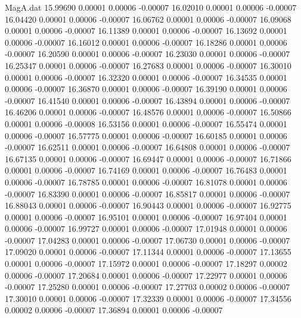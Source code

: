\begin{filecontents}{MagA.dat}
  15.99690    0.00001    0.00006   -0.00007
  16.02010    0.00001    0.00006   -0.00007
  16.04420    0.00001    0.00006   -0.00007
  16.06762    0.00001    0.00006   -0.00007
  16.09068    0.00001    0.00006   -0.00007
  16.11389    0.00001    0.00006   -0.00007
  16.13692    0.00001    0.00006   -0.00007
  16.16012    0.00001    0.00006   -0.00007
  16.18286    0.00001    0.00006   -0.00007
  16.20590    0.00001    0.00006   -0.00007
  16.23030    0.00001    0.00006   -0.00007
  16.25347    0.00001    0.00006   -0.00007
  16.27683    0.00001    0.00006   -0.00007
  16.30010    0.00001    0.00006   -0.00007
  16.32320    0.00001    0.00006   -0.00007
  16.34535    0.00001    0.00006   -0.00007
  16.36870    0.00001    0.00006   -0.00007
  16.39190    0.00001    0.00006   -0.00007
  16.41540    0.00001    0.00006   -0.00007
  16.43894    0.00001    0.00006   -0.00007
  16.46206    0.00001    0.00006   -0.00007
  16.48576    0.00001    0.00006   -0.00007
  16.50866    0.00001    0.00006   -0.00008
  16.53156    0.00001    0.00006   -0.00007
  16.55474    0.00001    0.00006   -0.00007
  16.57775    0.00001    0.00006   -0.00007
  16.60185    0.00001    0.00006   -0.00007
  16.62511    0.00001    0.00006   -0.00007
  16.64808    0.00001    0.00006   -0.00007
  16.67135    0.00001    0.00006   -0.00007
  16.69447    0.00001    0.00006   -0.00007
  16.71866    0.00001    0.00006   -0.00007
  16.74169    0.00001    0.00006   -0.00007
  16.76483    0.00001    0.00006   -0.00007
  16.78785    0.00001    0.00006   -0.00007
  16.81078    0.00001    0.00006   -0.00007
  16.83390    0.00001    0.00006   -0.00007
  16.85817    0.00001    0.00006   -0.00007
  16.88043    0.00001    0.00006   -0.00007
  16.90443    0.00001    0.00006   -0.00007
  16.92775    0.00001    0.00006   -0.00007
  16.95101    0.00001    0.00006   -0.00007
  16.97404    0.00001    0.00006   -0.00007
  16.99727    0.00001    0.00006   -0.00007
  17.01948    0.00001    0.00006   -0.00007
  17.04283    0.00001    0.00006   -0.00007
  17.06730    0.00001    0.00006   -0.00007
  17.09020    0.00001    0.00006   -0.00007
  17.11344    0.00001    0.00006   -0.00007
  17.13655    0.00001    0.00006   -0.00007
  17.15972    0.00001    0.00006   -0.00007
  17.18297    0.00002    0.00006   -0.00007
  17.20684    0.00001    0.00006   -0.00007
  17.22977    0.00001    0.00006   -0.00007
  17.25280    0.00001    0.00006   -0.00007
  17.27703    0.00002    0.00006   -0.00007
  17.30010    0.00001    0.00006   -0.00007
  17.32339    0.00001    0.00006   -0.00007
  17.34556    0.00002    0.00006   -0.00007
  17.36894    0.00001    0.00006   -0.00007

\end{filecontents}
